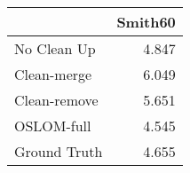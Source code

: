 \begin{tabular}{lr}
\toprule
{} & Smith60 \\
\midrule
No Clean Up  &   4.847 \\
Clean-merge  &   6.049 \\
Clean-remove &   5.651 \\
OSLOM-full   &   4.545 \\
Ground Truth &   4.655 \\
\bottomrule
\end{tabular}
